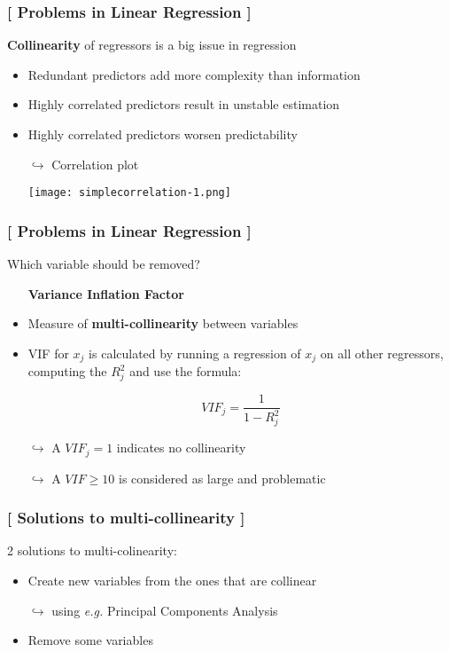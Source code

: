 \documentclass[xcolor=x11names,compress, aspectratio=169]{beamer}
\renewcommand{\(}{\begin{columns}}
\renewcommand{\)}{\end{columns}}
\newcommand{\<}[1]{\begin{column}{#1}}
\renewcommand{\>}{\end{column}}
\begin{document}
\begin{frame} %
\frametitle{\textcolor{brique}{[ Problems in Linear Regression ]}}
\textbf{Collinearity } of regressors is a big issue in regression
\pause
\begin{itemize}[<+->]
  \item Redundant predictors add more complexity than information
  \item Highly correlated predictors result in unstable estimation
  \item Highly correlated predictors worsen predictability
  \item[$\hookrightarrow$] Correlation plot
  \item[] \texttt{[image: simplecorrelation-1.png]}
\end{itemize}
\end{frame}

\begin{frame} %
\frametitle{\textcolor{brique}{[ Problems in Linear Regression ]}}
 Which variable should be removed?
 \pause
\begin{itemize}[<+->]
  \item[] \textbf{Variance Inflation Factor}
  \item Measure of \textbf{multi-collinearity} between variables
  \item VIF for  $x_j$ is calculated by running a regression of $x_j$ on all other regressors, computing the $R_j^2$ and use the formula:
  \item[] $$
  VIF_j  = \frac{1}{1 - R^2_j}
  $$
 \item[$\hookrightarrow$] A  $VIF_j = 1$ indicates no collinearity
 \item[$\hookrightarrow$] A $VIF \geq 10$  is considered as large and problematic
\end{itemize}
\end{frame}

\begin{frame} %
\frametitle{\textcolor{brique}{[ Solutions to multi-collinearity ]}}
2 solutions to multi-colinearity:
\pause
\begin{itemize}[<+->]
  \item Create new variables from the ones that are collinear
  \item[$\hookrightarrow$] using \textit{e.g.} Principal Components Analysis
  \item Remove some variables
\end{itemize}
\end{frame}
\end{document}
